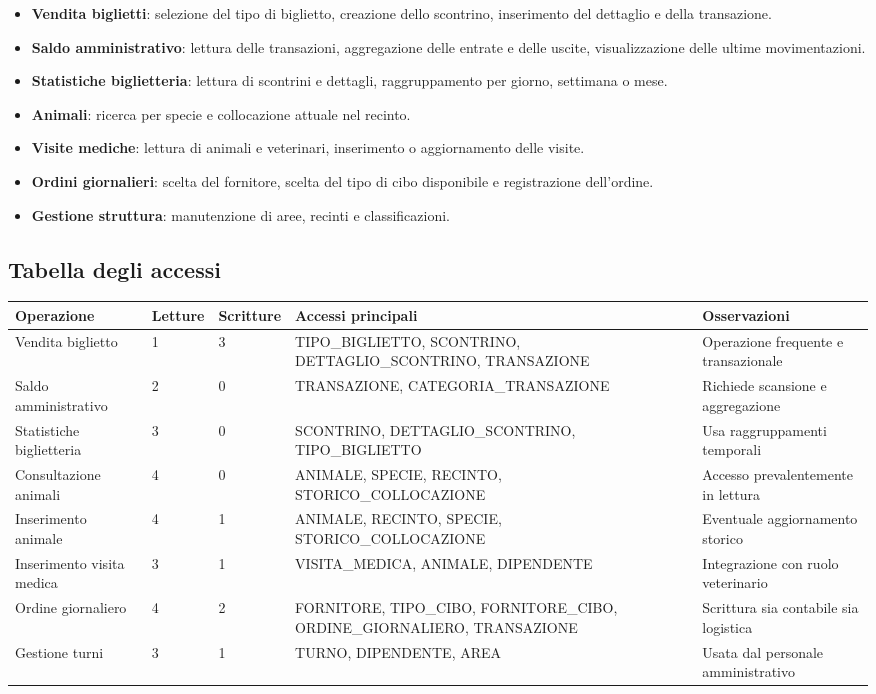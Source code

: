 \documentclass[12pt,a4paper]{report}
\begin{document}
\begin{itemize}[itemsep=2pt]
    \item \textbf{Vendita biglietti}: selezione del tipo di biglietto, creazione dello scontrino, inserimento del dettaglio e della transazione.
    \item \textbf{Saldo amministrativo}: lettura delle transazioni, aggregazione delle entrate e delle uscite, visualizzazione delle ultime movimentazioni.
    \item \textbf{Statistiche biglietteria}: lettura di scontrini e dettagli, raggruppamento per giorno, settimana o mese.
    \item \textbf{Animali}: ricerca per specie e collocazione attuale nel recinto.
    \item \textbf{Visite mediche}: lettura di animali e veterinari, inserimento o aggiornamento delle visite.
    \item \textbf{Ordini giornalieri}: scelta del fornitore, scelta del tipo di cibo disponibile e registrazione dell'ordine.
    \item \textbf{Gestione struttura}: manutenzione di aree, recinti e classificazioni.
\end{itemize}

\subsection{Tabella degli accessi}

\begin{longtable}{L{5cm} C{1.5cm} C{1.8cm} C{3.5cm} C{2.8cm}}
\toprule
\textbf{Operazione} & \textbf{Letture} & \textbf{Scritture} & \textbf{Accessi principali} & \textbf{Osservazioni} \\
\midrule
\endhead
Vendita biglietto & 1 & 3 & TIPO\_BIGLIETTO, SCONTRINO, DETTAGLIO\_SCONTRINO, TRANSAZIONE & Operazione frequente e transazionale \\
Saldo amministrativo & 2 & 0 & TRANSAZIONE, CATEGORIA\_TRANSAZIONE & Richiede scansione e aggregazione \\
Statistiche biglietteria & 3 & 0 & SCONTRINO, DETTAGLIO\_SCONTRINO, TIPO\_BIGLIETTO & Usa raggruppamenti temporali \\
Consultazione animali & 4 & 0 & ANIMALE, SPECIE, RECINTO, STORICO\_COLLOCAZIONE & Accesso prevalentemente in lettura \\
Inserimento animale & 4 & 1 & ANIMALE, RECINTO, SPECIE, STORICO\_COLLOCAZIONE & Eventuale aggiornamento storico \\
Inserimento visita medica & 3 & 1 & VISITA\_MEDICA, ANIMALE, DIPENDENTE & Integrazione con ruolo veterinario \\
Ordine giornaliero & 4 & 2 & FORNITORE, TIPO\_CIBO, FORNITORE\_CIBO, ORDINE\_GIORNALIERO, TRANSAZIONE & Scrittura sia contabile sia logistica \\
Gestione turni & 3 & 1 & TURNO, DIPENDENTE, AREA & Usata dal personale amministrativo \\
\bottomrule
\end{longtable}
\end{document}
